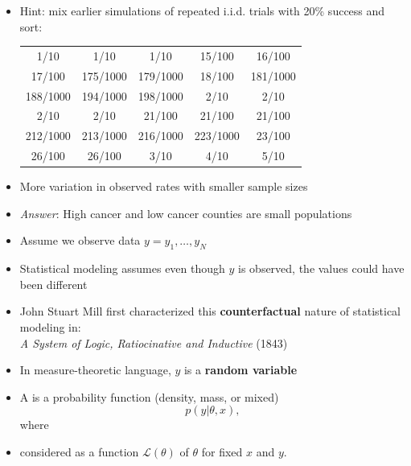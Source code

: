 \documentclass[10pt]{report}
\begin{document}
%
\begin{itemize}
\item Hint: mix earlier simulations of repeated i.i.d. trials with 20\% success and sort:
{\footnotesize
\begin{center}
\begin{tabular}{ccccc}
1/10 &  1/10 &  1/10 &  15/100 &  16/100
\\
17/100 &  175/1000 &  179/1000 &  18/100 &  181/1000
\\
188/1000 &  194/1000 &  198/1000 & 2/10 &  2/10 
\\
2/10 &  2/10 & 21/100 &  21/100 &  21/100 
\\
212/1000 &  213/1000 &   216/1000 &   223/1000 &  23/100
\\
26/100 &  26/100 &  3/10 &  4/10 &  5/10 
\end{tabular}
\end{center}
}
\item More variation in observed rates with smaller sample sizes
\vfill
\item \emph{Answer}: High cancer and low cancer counties are small populations
\end{itemize}





\begin{itemize}
\item Assume we observe data $y = y_1, \ldots, y_N$
\item Statistical modeling assumes even though $y$ is observed,
the values could have been different
\item John Stuart Mill first characterized this {\bfseries counterfactual} nature of statistical modeling in:
\\[3pt] {\slshape A System of Logic, Ratiocinative and Inductive} (1843)
\item In measure-theoretic language, $y$ is a {\bfseries random variable}
\end{itemize}

%
\begin{itemize}
\item A  is a probability function (density, mass, or mixed) 
\[
p(y|\theta,x),
\]
where
\item considered as a function $\mathcal{L}(\theta)$ of $\theta$ for fixed $x$ and $y$.
\end{itemize}
\end{document}
